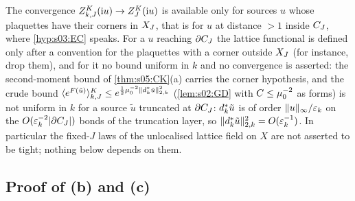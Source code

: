 \begin{remark}\label{rem:s09:S2K}
The convergence $Z^K_{k,J}(\mathrm iu)\to Z^{K}_{J}(\mathrm iu)$ is available only for sources $u$ whose plaquettes have their corners in $X_J$, that is for $u$ at distance $>1$ inside $C_J$, where \cref{hyp:s03:EC} speaks. For a $u$ reaching $\partial C_J$ the lattice functional is defined only after a convention for the plaquettes with a corner outside $X_J$ (for instance, drop them), and for it no bound uniform in $k$ and no convergence is asserted: the second-moment bound of \cref{thm:s05:CK}(a) carries the corner hypothesis, and the crude bound $\langle e^{F(\tilde u)}\rangle^{K}_{k,J}\le e^{\frac12\mu_0^{-2}\lVert d^{*}_k\tilde u\rVert^2_{2,k}}$ (\cref{lem:s02:GD} with $C\le\mu_0^{-2}$ as forms) is not uniform in $k$ for a source $\tilde u$ truncated at $\partial C_J$: $d^{*}_k\tilde u$ is of order $\lVert u\rVert_\infty/\varepsilon_k$ on the $O(\varepsilon_k^{-2}|\partial C_J|)$ bonds of the truncation layer, so $\lVert d^{*}_k\tilde u\rVert^2_{2,k}=O(\varepsilon_k^{-1})$. In particular the fixed-$J$ laws of the unlocalised lattice field on $X$ are not asserted to be tight; nothing below depends on them.
\end{remark}

\subsection{Proof of (b) and (c)}

